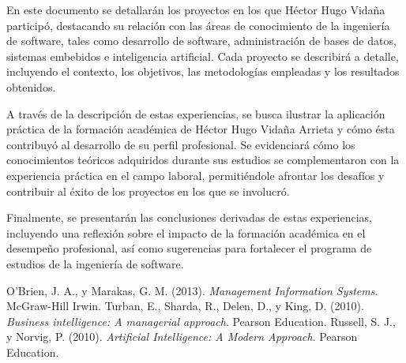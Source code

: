 \documentclass[final, fmstyle, 12pt]{article}
\begin{document}
En este documento se detallarán los proyectos en los que Héctor Hugo Vidaña participó, destacando su relación con las áreas de conocimiento de la ingeniería de software, tales como  desarrollo de software, administración de bases de datos,
sistemas embebidos e inteligencia artificial.  Cada proyecto se describirá a detalle, incluyendo el contexto, los objetivos, las metodologías empleadas y los resultados obtenidos.

A través de la descripción de estas experiencias, se busca ilustrar la aplicación práctica de la formación académica de Héctor Hugo Vidaña Arrieta y cómo ésta contribuyó al desarrollo de su perfil profesional. Se  evidenciará cómo los conocimientos teóricos adquiridos durante sus estudios se complementaron con la experiencia práctica en el campo laboral,  permitiéndole afrontar los desafíos y  contribuir al éxito de los proyectos en los que se involucró.

Finalmente, se presentarán las conclusiones derivadas de estas experiencias, incluyendo una reflexión sobre el impacto de la formación académica en el desempeño profesional,  así como  sugerencias para fortalecer el programa de estudios de la ingeniería de software.
\newpage
\tableofcontents 

\newpage 


\newpage 


\newpage 

\newpage 


\newpage

% 
\begin{thebibliography}{99}
     O'Brien, J. A., y Marakas, G. M. (2013). \textit{Management Information Systems}. McGraw-Hill Irwin.
     Turban, E., Sharda, R., Delen, D., y King, D. (2010). \textit{Business intelligence: A managerial approach}. Pearson Education.
     Russell, S. J., y Norvig, P. (2010). \textit{Artificial Intelligence: A Modern Approach}. Pearson Education.
\end{thebibliography}
\end{document}
